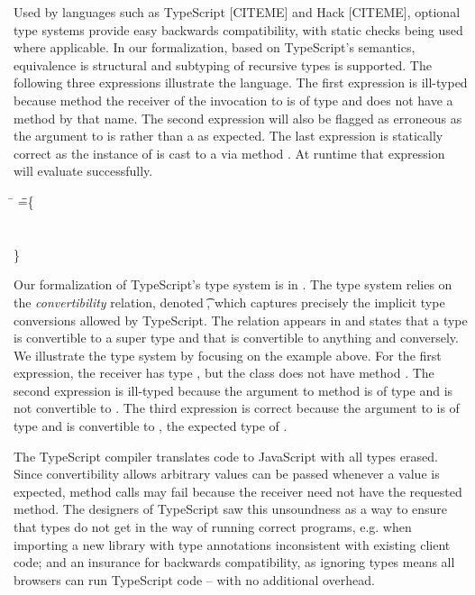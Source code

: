 \documentclass{tex/llncs}
\begin{document}
Used by languages such as TypeScript [CITEME] and Hack [CITEME], optional type
systems provide  easy backwards compatibility, with static checks being used
where applicable. In our formalization, based on TypeScript's semantics,
equivalence is structural and subtyping of recursive types is supported. The
following three expressions illustrate the language. The first expression is
ill-typed because method the receiver of the invocation to \n is of type \C
and \C does not have a method by that name. The second expression will also be
flagged as erroneous as the argument to \m is \C rather than a \D as expected.
The last expression is statically correct as the instance of \C is cast to a
\D via method \mp. At runtime that expression will evaluate successfully.


{\small
\begin{tabbing}
  \hspace{.5cm}
   \=  \Call{\New\C{}}\n{\New\D{}} \HS\HS\HS\HS\HS\HS\HS\HS\HS\HS\HS\HS\HS\HS\WHERE\HS \K\HS =\HS\= \class\= \C \{\\
   \> \Call{\New\C{}}\m{\New\C{}}                                  \>  \HS  \Mdef\m\x\D\C{~\this~} \\
   \> \Call{\New\C{}}\m{\Call{\New\C{}}\mp{\New\C{}}}              \>  \HS  \Mdef\mp\x\any\D{~\x~}\\
   \>                                                              \>  \}   \\
   \>                                                              \> \Class\D{}{}
\end{tabbing}}


\noindent
Our formalization of TypeScript's type system is in
. The type system relies on the \emph{convertibility}
relation, denoted \ConvertE{}\t\tp, which captures precisely the implicit
type conversions allowed by TypeScript.  The relation appears in
 and states that a type is convertible to a super type and
that \any is convertible to anything and conversely. We illustrate the type
system by focusing on the example above. For the first expression, the
receiver has type \C, but the class does not have method \n. The second
expression is ill-typed because the argument to method \m is of type \C and
\C is not convertible to \D. The third expression is correct because the
argument to \mp is of type \C and \C is convertible to \any, the expected
type of \mp.

The TypeScript compiler translates code to JavaScript with all types erased.
Since convertibility allows arbitrary values can be passed whenever a \any
value is expected, method calls may fail because the receiver need not have
the requested method. The designers of TypeScript saw this unsoundness as a
way to ensure that types do not get in the way of running correct programs,
e.g. when importing a new library with type annotations inconsistent with
existing client code; and an insurance for backwards compatibility, as
ignoring types means all browsers can run TypeScript code -- with no
additional overhead.
\end{document}
